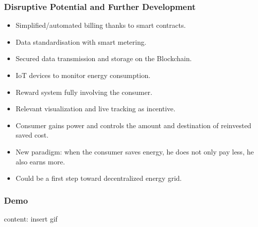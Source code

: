 \documentclass[t]{beamer}
\begin{document}
  \begin{frame}[t]
    \frametitle{Disruptive Potential and Further Development}
    \begin{itemize}
    	\item{Simplified/automated billing thanks to smart contracts.}
    	\item{Data standardisation with smart metering.}
    	\item{Secured data transmission and storage on the Blockchain.}
    	\item{IoT devices to monitor energy consumption.}
		\item{Reward system fully involving the consumer.}    
		\item{Relevant visualization and live tracking as incentive.}
		\item{Consumer gains power and controls the amount and destination of reinvested saved cost.}
		\item{New paradigm: when the consumer saves energy, he does not only pay less, he also earns more.}
		\item{Could be a first step toward decentralized energy grid.}
    \end{itemize}
    \end{frame}

  \begin{frame}
    \frametitle{Demo}
    content: insert gif
  \end{frame}
\end{document}
